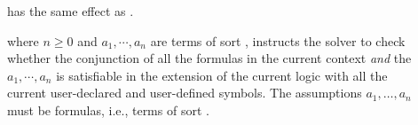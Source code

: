 \begin{description}

%
\item[] has the same effect as .
\smallskip





%
\item[] where $n \geq 0$
and $a_1, \cdots, a_n$ are terms of sort ,
%
instructs the solver to check whether the conjunction of all the formulas 
in the current context \emph{and} the  $a_1, \cdots, a_n$
is satisfiable in the extension of the current logic with all the current 
user-declared and user-defined symbols.
The assumptions $a_1, \ldots, a_n$ must be formulas, i.e., terms of sort
.


\end{description}
